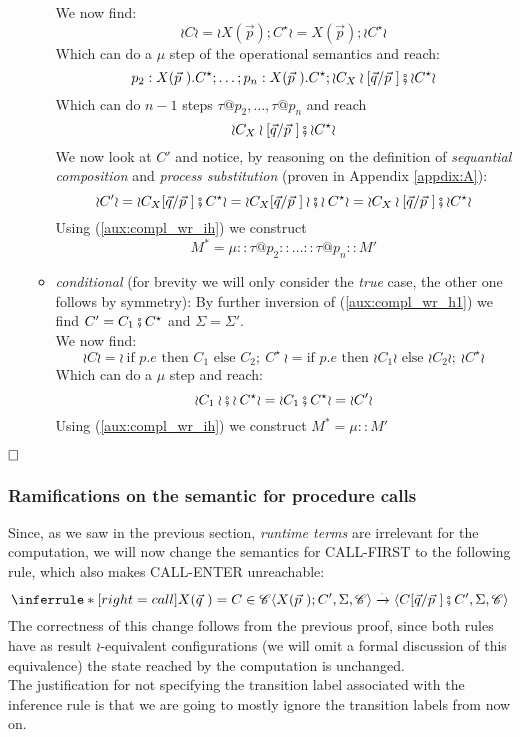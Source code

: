 \documentclass[12pt,a4paper,twoside]{book}
\newcommand{\qed}{\hfill\square}
\begin{document}
\begin{itemize}
\begin{itemize}
			We now find:
				$$\wr C \wr = \wr X(\vec{p}); C^\star \wr = X(\vec{p}); \wr C^\star \wr$$
			Which can do a $\mu$ step of the operational semantics and reach:
				$$p_2 : X(\vec{p}~).C^\star; \ldots; p_n : X(\vec{p}~).C^\star; \wr C_X\wr[\vec{q}/\vec{p}~] \fatsemi \wr C^\star \wr$$
			Which can do $n-1$ steps $\tau@p_2, \ldots, \tau@p_n$ and reach
				$$\wr C_X\wr[\vec{q}/\vec{p}~] \fatsemi \wr C^\star \wr$$
				We now look at $C'$ and notice, by reasoning on the definition of \emph{sequantial composition} and \emph{process substitution} (proven in Appendix \ref{appdix:A}):
				$$ \wr C' \wr = \wr C_X[\vec{q}/\vec{p}~] \fatsemi C^\star \wr =
		\wr C_X[\vec{q}/\vec{p}~] \wr \fatsemi \wr C^\star \wr =
				\wr C_X\wr[\vec{q}/\vec{p}~] \fatsemi \wr C^\star \wr$$
				Using (\ref{aux:compl_wr_ih}) we construct
				$$ M^* = \mu :: \tau@p_2 :: \ldots :: \tau@p_n :: M'$$
			\item \emph{conditional} (for brevity we will only consider the \emph{true} case, the other one follows by symmetry):
				By further inversion of (\ref{aux:compl_wr_h1}) we find $C' = C_1 \fatsemi C^\star$ and $\Sigma = \Sigma'$.\\
				We now find:
				$$
				\wr C \wr = \wr~\text{if } p.e \text{ then } C_1 \text{ else } C_2;~C^\star~\wr 
				= \text{if } p.e \text{ then } \wr C_1 \wr \text{ else } \wr C_2\wr;~\wr C^\star \wr 
				$$
				Which can do a $\mu$ step and reach:
				$$ \wr C_1 \wr \fatsemi \wr C^\star \wr = \wr C_1 \fatsemi C^\star \wr = \wr C' \wr$$
				Using (\ref{aux:compl_wr_ih}) we construct $M^* = \mu :: M'$
		\end{itemize}
\end{itemize}
$\qed$

\subsubsection{Ramifications on the semantic for procedure calls}
Since, as we saw in the previous section, \emph{runtime terms} are irrelevant for the computation, we will now change the semantics for CALL-FIRST to the following rule, which also makes CALL-ENTER unreachable:
$$
    \inferrule*[right=call] { X(\vec{q}~) = C \in \mathscr{C}}
	{\langle X(\vec{p}~);C', \Sigma, \mathscr{C} \rangle \xrightarrow{\cdot} \langle C[\vec{q}/\vec{p}~] \fatsemi C', \Sigma, \mathscr{C} \rangle}
$$
The correctness of this change follows from the previous proof, since both rules have as result $\wr$-equivalent configurations (we will omit a formal discussion of this equivalence) the state reached by the computation is unchanged.\\
The justification for not specifying the transition label associated with the inference rule is that we are going to mostly ignore the transition labels from now on.
\end{document}
